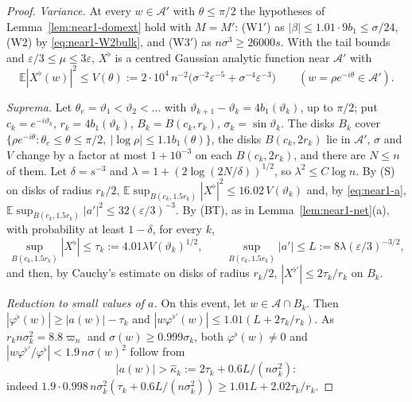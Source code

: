 \documentclass[11pt]{amsart}
\theoremstyle{definition}
\theoremstyle{remark}
\numberwithin{equation}{section}
\newcommand{\E}{\mathbb{E}}
\newcommand{\eps}{\varepsilon}
\begin{document}
\begin{proof}
\emph{Variance.} At every $w\in\mathcal A'$ with $\theta\le\pi/2$ the hypotheses of Lemma~\ref{lem:near1-domext} hold with $M=M'$: (W1$'$) as $|\beta|\le1.01\cdot9b_1\le\sigma/24$, (W2) by \eqref{eq:near1-W2bulk}, and (W3$'$) as $n\sigma^3\ge26000s$. With the tail bounds and $\eps/3\le\mu\le3\eps$, $X^\flat$ is a centred Gaussian analytic function near $\mathcal A'$ with
\[
\E|X^\flat(w)|^2\le V(\theta):=2\cdot10^4\,n^{-2}\bigl(\sigma^{-2}\eps^{-5}+\sigma^{-4}\eps^{-3}\bigr)\qquad(w=\rho e^{-i\theta}\in\mathcal A').
\]

\emph{Suprema.} Let $\theta_e=\vartheta_1<\vartheta_2<\dots$ with $\vartheta_{k+1}-\vartheta_k=4b_1(\vartheta_k)$, up to $\pi/2$; put $c_k=e^{-i\vartheta_k}$, $r_k=4b_1(\vartheta_k)$, $B_k=B(c_k,r_k)$, $\sigma_k=\sin\vartheta_k$. The disks $B_k$ cover $\{\rho e^{-i\theta}:\theta_e\le\theta\le\pi/2,\ |\log\rho|\le1.1b_1(\theta)\}$, the disks $B(c_k,2r_k)$ lie in $\mathcal A'$, $\sigma$ and $V$ change by a factor at most $1+10^{-3}$ on each $B(c_k,2r_k)$, and there are $N\le n$ of them. Let $\delta=s^{-3}$ and $\lambda=1+(2\log(2N/\delta))^{1/2}$, so $\lambda^2\le C\log n$. By (S) on disks of radius $r_k/2$, $\E\sup_{B(c_k,1.5r_k)}|X^\flat|^2\le16.02\,V(\vartheta_k)$ and, by \eqref{eq:near1-a}, $\E\sup_{B(c_k,1.5r_k)}|a'|^2\le32(\eps/3)^{-3}$. By (BT), as in Lemma~\ref{lem:near1-net}(a), with probability at least $1-\delta$, for every $k$,
\[
\sup_{B(c_k,1.5r_k)}|X^\flat|\le\tau_k:=4.01\lambda V(\vartheta_k)^{1/2},\qquad\sup_{B(c_k,1.5r_k)}|a'|\le L:=8\lambda(\eps/3)^{-3/2},
\]
and then, by Cauchy's estimate on disks of radius $r_k/2$, $|X^{\flat\prime}|\le2\tau_k/r_k$ on $B_k$.

\emph{Reduction to small values of $a$.} On this event, let $w\in\mathcal A\cap B_k$. Then $|\varphi^\flat(w)|\ge|a(w)|-\tau_k$ and $|w\varphi^{\flat\prime}(w)|\le1.01(L+2\tau_k/r_k)$. As $r_kn\sigma_k^2=8.8\varpi_n$ and $\sigma(w)\ge0.999\sigma_k$, both $\varphi^\flat(w)\ne0$ and $|w\varphi^{\flat\prime}/\varphi^\flat|<1.9\,n\sigma(w)^2$ follow from
\[
|a(w)|>\hat\kappa_k:=2\tau_k+0.6L/(n\sigma_k^2):
\]
indeed $1.9\cdot0.998\,n\sigma_k^2(\tau_k+0.6L/(n\sigma_k^2))\ge1.01L+2.02\tau_k/r_k$.


\end{proof}
\end{document}
